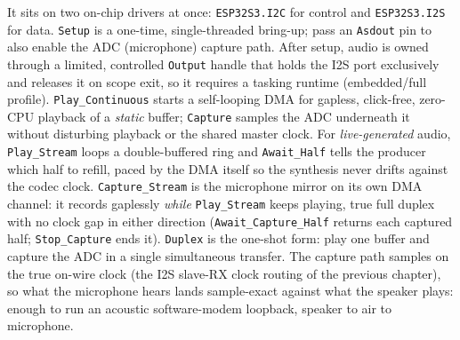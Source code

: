 It sits on two on-chip drivers at once: \texttt{ESP32S3.I2C} for control and
\texttt{ESP32S3.I2S} for data. \texttt{Setup} is a one-time, single-threaded
bring-up; pass an \texttt{Asdout} pin to also enable the ADC (microphone) capture
path. After setup, audio is owned through a limited, controlled \texttt{Output}
handle that holds the I2S port exclusively and releases it on scope exit, so it
requires a tasking runtime (embedded/full profile). \texttt{Play\_Continuous}
starts a self-looping DMA for gapless, click-free, zero-CPU playback of a
\emph{static} buffer; \texttt{Capture} samples the ADC underneath it without
disturbing playback or the shared master clock. For \emph{live-generated}
audio, \texttt{Play\_Stream} loops a double-buffered ring and
\texttt{Await\_Half} tells the producer which half to refill, paced by the DMA
itself so the synthesis never drifts against the codec clock.
\texttt{Capture\_Stream} is the microphone mirror on its own DMA channel: it
records gaplessly \emph{while} \texttt{Play\_Stream} keeps playing, true full
duplex with no clock gap in either direction (\texttt{Await\_Capture\_Half}
returns each captured half; \texttt{Stop\_Capture} ends it).
\texttt{Duplex} is the one-shot form: play one buffer and capture the ADC in a
single simultaneous transfer. The capture path samples on the true on-wire
clock (the I2S slave-RX clock routing of the previous chapter), so what the
microphone hears lands sample-exact against what the speaker plays: enough to
run an acoustic software-modem loopback, speaker to air to microphone.

